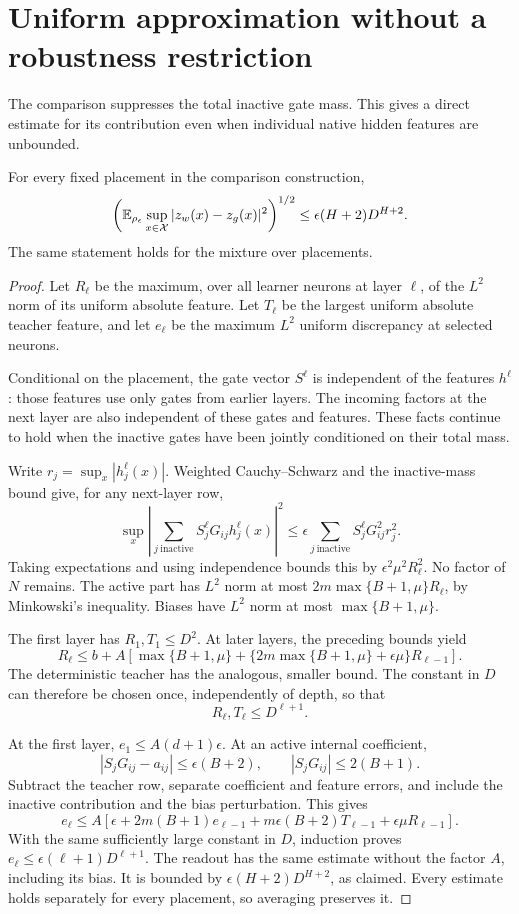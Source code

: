 \section{Uniform approximation without a robustness restriction}
The comparison suppresses the total inactive gate mass. This gives a direct estimate for its contribution even when individual native hidden features are unbounded.

\begin{lemma}\label{lem:stability}
For every fixed placement in the comparison construction,
\[
 \left(\mathbb E_{\rho_\epsilon}\sup_{x\in\mathcal X}
       |z_w(x)-z_g(x)|^2\right)^{1/2}
 \le\epsilon(H+2)D^{H+2}.
\]
The same statement holds for the mixture over placements.
\end{lemma}
\begin{proof}
Let $R_\ell$ be the maximum, over all learner neurons at layer $\ell$, of the $L^2$ norm of its uniform absolute feature. Let $T_\ell$ be the largest uniform absolute teacher feature, and let $e_\ell$ be the maximum $L^2$ uniform discrepancy at selected neurons.

Conditional on the placement, the gate vector $S^\ell$ is independent of the features $h^\ell$: those features use only gates from earlier layers. The incoming factors at the next layer are also independent of these gates and features. These facts continue to hold when the inactive gates have been jointly conditioned on their total mass.

Write $r_j=\sup_x|h_j^\ell(x)|$. Weighted Cauchy--Schwarz and the inactive-mass bound give, for any next-layer row,
\[
 \sup_x\left|\sum_{j\ \mathrm{inactive}}S_j^\ell G_{ij}h_j^\ell(x)\right|^2
 \le\epsilon\sum_{j\ \mathrm{inactive}}S_j^\ell G_{ij}^2r_j^2.
\]
Taking expectations and using independence bounds this by
$\epsilon^2\mu^2R_\ell^2$. No factor of $N$ remains. The active part has $L^2$ norm at most
$2m\max\{B+1,\mu\}R_\ell$, by Minkowski's inequality. Biases have $L^2$ norm at most $\max\{B+1,\mu\}$.

The first layer has $R_1,T_1\le D^2$. At later layers, the preceding bounds yield
\[
 R_\ell\le b+A\left[
 \max\{B+1,\mu\}+
 \{2m\max\{B+1,\mu\}+\epsilon\mu\}R_{\ell-1}
 \right].
\]
The deterministic teacher has the analogous, smaller bound. The constant in $D$ can therefore be chosen once, independently of depth, so that
\[
 R_\ell,T_\ell\le D^{\ell+1}.
 \label{eq:feature-envelope}
\]

At the first layer, $e_1\le A(d+1)\epsilon$. At an active internal coefficient,
\[
 |S_jG_{ij}-a_{ij}|\le\epsilon(B+2),
 \qquad |S_jG_{ij}|\le2(B+1).
\]
Subtract the teacher row, separate coefficient and feature errors, and include the inactive contribution and the bias perturbation. This gives
\[
 e_\ell\le A\left[
 \epsilon+2m(B+1)e_{\ell-1}
 +m\epsilon(B+2)T_{\ell-1}+\epsilon\mu R_{\ell-1}
 \right].
\]
With the same sufficiently large constant in $D$, induction proves
$e_\ell\le\epsilon(\ell+1)D^{\ell+1}$. The readout has the same estimate without the factor $A$, including its bias. It is bounded by
$\epsilon(H+2)D^{H+2}$, as claimed. Every estimate holds separately for every placement, so averaging preserves it.
\end{proof}


